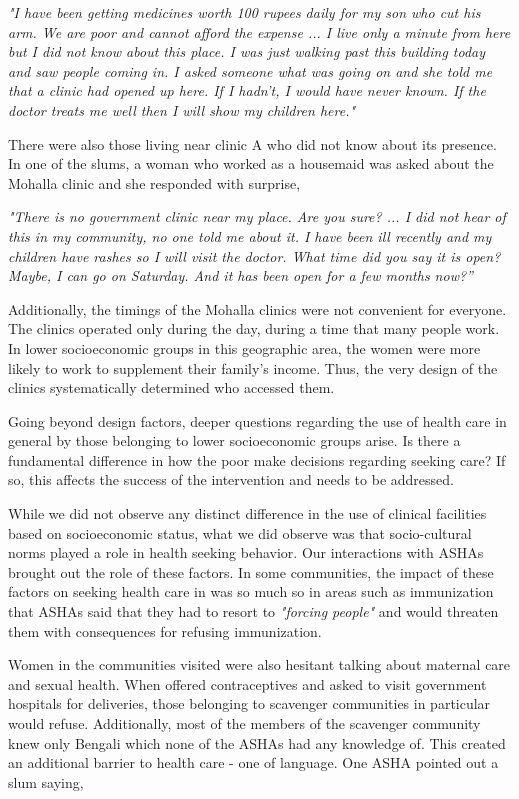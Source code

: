 \textit{"I have been getting medicines worth 100 rupees daily for my son who cut his arm. We are poor and cannot afford the expense ... I live only a minute from here but I did not know about this place. I was just walking past this building today and saw people coming in. I asked someone what was going on and she told me that a clinic had opened up here. If I hadn't, I would have never known. If the doctor treats me well then I will show my children here."}

There were also those living near clinic A who did not know about its presence. In one of the slums, a woman who worked as a housemaid was asked about the Mohalla clinic and she responded with surprise,

\textit{"There is no government clinic near my place. Are you sure? ... I did not hear of this in my community, no one told me about it. I have been ill recently and my children have rashes so I will visit the doctor. What time did you say it is open? Maybe, I can go on Saturday. And it has been open for a few months now?”}

Additionally, the timings of the Mohalla clinics were not convenient for everyone. The clinics operated only during the day, during a time that many people work. In lower socioeconomic groups in this geographic area, the women were more likely to work to supplement their family's income. Thus, the very design of the clinics systematically determined who accessed them.

Going beyond design factors, deeper questions regarding the use of health care in general by those belonging to lower socioeconomic groups arise. Is there a fundamental difference in how the poor make decisions regarding seeking care? If so, this affects the success of the intervention and needs to be addressed.

While we did not observe any distinct difference in the use of clinical facilities based on socioeconomic status, what we did observe was that socio-cultural norms played a role in health seeking behavior. Our interactions with ASHAs brought out the role of these factors. In some communities, the impact of these factors on seeking health care in was so much so in areas such as immunization that ASHAs said that they had to resort to \textit{"forcing people"} and would threaten them with consequences for refusing immunization.

Women in the communities visited were also hesitant talking about maternal care and sexual health. When offered contraceptives and asked to visit government hospitals for deliveries, those belonging to scavenger communities in particular would refuse. Additionally, most of the members of the scavenger community knew only Bengali which none of the ASHAs had any knowledge of. This created an additional barrier to health care - one of language. One ASHA pointed out a slum saying,

